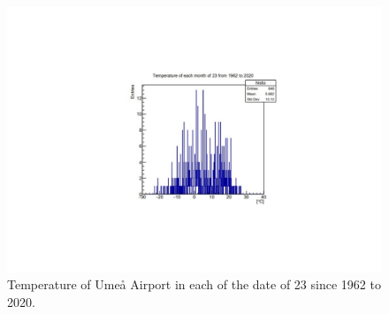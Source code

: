 \documentclass[a4, 12pt]{article}
\begin{document}
\begin{figure}[H]
\centering
\includegraphics[scale=0.7]{chrisFig3.pdf}
\caption{ Temperature of Umeå Airport in each of the date of 23 since 1962 to 2020.}
\end{figure}







\end{document}
